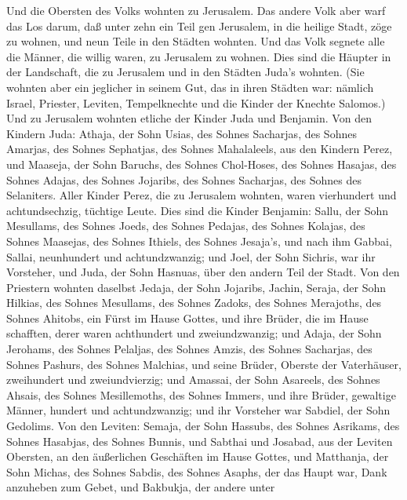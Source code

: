  Und die Obersten des Volks wohnten zu Jerusalem. Das andere
Volk aber warf das Los darum, daß unter zehn ein Teil gen Jerusalem, in
die heilige Stadt, zöge zu wohnen, und neun Teile in den Städten
wohnten.  Und das Volk segnete alle die Männer, die willig
waren, zu Jerusalem zu wohnen.  Dies sind die Häupter in der
Landschaft, die zu Jerusalem und in den Städten Juda's wohnten. (Sie
wohnten aber ein jeglicher in seinem Gut, das in ihren Städten war:
nämlich Israel, Priester, Leviten, Tempelknechte und die Kinder der
Knechte Salomos.)  Und zu Jerusalem wohnten etliche der
Kinder Juda und Benjamin. Von den Kindern Juda: Athaja, der Sohn Usias,
des Sohnes Sacharjas, des Sohnes Amarjas, des Sohnes Sephatjas, des
Sohnes Mahalaleels, aus den Kindern Perez,  und Maaseja, der
Sohn Baruchs, des Sohnes Chol-Hoses, des Sohnes Hasajas, des Sohnes
Adajas, des Sohnes Jojaribs, des Sohnes Sacharjas, des Sohnes des
Selaniters.  Aller Kinder Perez, die zu Jerusalem wohnten,
waren vierhundert und achtundsechzig, tüchtige Leute.  Dies
sind die Kinder Benjamin: Sallu, der Sohn Mesullams, des Sohnes Joeds,
des Sohnes Pedajas, des Sohnes Kolajas, des Sohnes Maasejas, des Sohnes
Ithiels, des Sohnes Jesaja's,  und nach ihm Gabbai, Sallai,
neunhundert und achtundzwanzig;  und Joel, der Sohn Sichris,
war ihr Vorsteher, und Juda, der Sohn Hasnuas, über den andern Teil der
Stadt.  Von den Priestern wohnten daselbst Jedaja, der Sohn
Jojaribs, Jachin,  Seraja, der Sohn Hilkias, des Sohnes
Mesullams, des Sohnes Zadoks, des Sohnes Merajoths, des Sohnes Ahitobs,
ein Fürst im Hause Gottes,  und ihre Brüder, die im Hause
schafften, derer waren achthundert und zweiundzwanzig; und Adaja, der
Sohn Jerohams, des Sohnes Pelaljas, des Sohnes Amzis, des Sohnes
Sacharjas, des Sohnes Pashurs, des Sohnes Malchias,  und
seine Brüder, Oberste der Vaterhäuser, zweihundert und zweiundvierzig;
und Amassai, der Sohn Asareels, des Sohnes Ahsais, des Sohnes
Mesillemoths, des Sohnes Immers,  und ihre Brüder,
gewaltige Männer, hundert und achtundzwanzig; und ihr Vorsteher war
Sabdiel, der Sohn Gedolims.  Von den Leviten: Semaja, der
Sohn Hassubs, des Sohnes Asrikams, des Sohnes Hasabjas, des Sohnes
Bunnis,  und Sabthai und Josabad, aus der Leviten Obersten,
an den äußerlichen Geschäften im Hause Gottes,  und
Matthanja, der Sohn Michas, des Sohnes Sabdis, des Sohnes Asaphs, der
das Haupt war, Dank anzuheben zum Gebet, und Bakbukja, der andere unter
